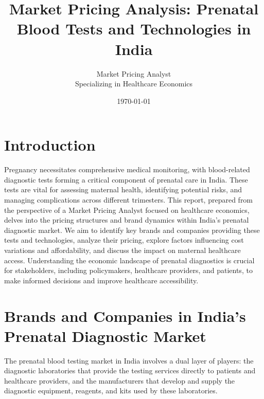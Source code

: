 \documentclass{article}
\title{Market Pricing Analysis: Prenatal Blood Tests and Technologies in India}
\author{Market Pricing Analyst \\ \small Specializing in Healthcare Economics}
\date{\today}
\begin{document}
\maketitle

\section{Introduction}
Pregnancy necessitates comprehensive medical monitoring, with blood-related diagnostic tests forming a critical component of prenatal care in India. These tests are vital for assessing maternal health, identifying potential risks, and managing complications across different trimesters. This report, prepared from the perspective of a Market Pricing Analyst focused on healthcare economics, delves into the pricing structures and brand dynamics within India's prenatal diagnostic market. We aim to identify key brands and companies providing these tests and technologies, analyze their pricing, explore factors influencing cost variations and affordability, and discuss the impact on maternal healthcare access. Understanding the economic landscape of prenatal diagnostics is crucial for stakeholders, including policymakers, healthcare providers, and patients, to make informed decisions and improve healthcare accessibility.

\section{Brands and Companies in India's Prenatal Diagnostic Market}
The prenatal blood testing market in India involves a dual layer of players: the diagnostic laboratories that provide the testing services directly to patients and healthcare providers, and the manufacturers that develop and supply the diagnostic equipment, reagents, and kits used by these laboratories.
\end{document}
